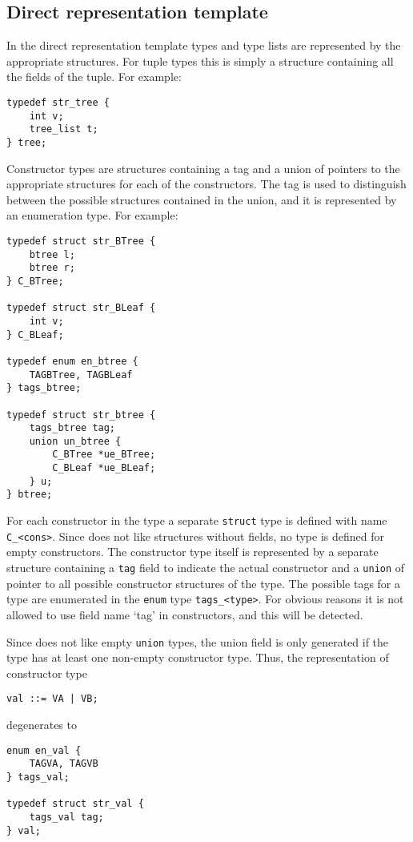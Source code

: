 \subsection{Direct representation template}
In the direct representation template {\Tm} types and type lists are
represented by the appropriate structures.
For tuple types this is simply a structure containing all the
fields of the tuple.
For example:
\begin{verbatim}
typedef str_tree {
    int v;
    tree_list t;
} tree;
\end{verbatim}
Constructor types are structures containing
a tag and a union of pointers to the appropriate structures
for each of the constructors.
The tag is used to distinguish between the possible structures
contained in the union, and it is represented by an enumeration type.
For example:
\begin{verbatim}
typedef struct str_BTree {
    btree l;
    btree r;
} C_BTree;

typedef struct str_BLeaf {
    int v;
} C_BLeaf;

typedef enum en_btree {
    TAGBTree, TAGBLeaf
} tags_btree;

typedef struct str_btree {
    tags_btree tag;
    union un_btree {
        C_BTree *ue_BTree;
        C_BLeaf *ue_BLeaf;
    } u;
} btree;
\end{verbatim}
For each constructor in the type a separate {\tt struct} type is defined
with name {\tt C\_<cons>}.
Since {\C} does not like structures without fields,
no type is defined for empty constructors.
The constructor type itself is represented by a separate structure containing
a {\tt tag} field to indicate the actual constructor
and a {\tt union} of pointer to all possible constructor structures of the type.
The possible tags for a type are enumerated in the {\tt enum} type
{\tt tags\_<type>}.
For obvious reasons it is not allowed to use field name `tag' in constructors,
and this will be detected.
\par
Since {\C} does not like empty {\tt union} types,
the union field is only generated if the type has at least
one non-empty constructor type.
Thus,
the representation of constructor type
\begin{verbatim}
val ::= VA | VB;
\end{verbatim}
degenerates to
\begin{verbatim}
enum en_val {
    TAGVA, TAGVB
} tags_val;

typedef struct str_val {
    tags_val tag;
} val;
\end{verbatim}
